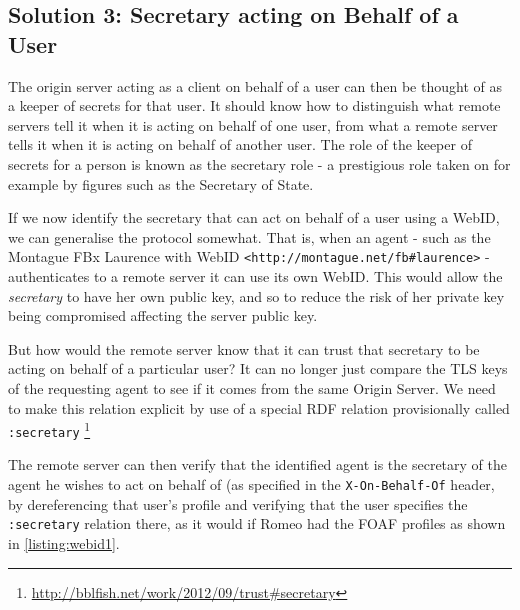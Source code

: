 \documentclass[a4paper]{llncs}
\begin{document}

\subsection{Solution 3: Secretary acting on Behalf of a User}

The origin server acting as a client on behalf of a user can then be thought of as a keeper of secrets for that user.
It should know how to distinguish what remote servers tell it when it is acting on behalf of one user, from what a remote server tells it when it is acting on behalf of another user.
The role of the keeper of secrets for a person is known as the secretary role - a prestigious role taken on for example by figures such as the Secretary of State.

If we now identify the secretary that can act on behalf of a user using a WebID, we can generalise the protocol somewhat.
That is, when an agent - such as the Montague FBx Laurence with WebID \lstinline|<http://montague.net/fb#laurence>| - authenticates to a remote server it can use its own WebID. 
This would allow the \textit{secretary} to have her own public key, and so to reduce the risk of her private key being compromised affecting the server public key.

But how would the remote server know that it can trust that secretary to be acting on behalf of a particular user?
It can no longer just compare the TLS keys of the requesting agent to see if it comes from the same Origin Server.
We need to make this relation explicit by use of a special RDF relation provisionally called \lstinline|:secretary|%
\footnote{\url{http://bblfish.net/work/2012/09/trust\#secretary} }

%

The remote server can then verify that the identified agent is the secretary of the agent he wishes to act on behalf of (as specified in the \lstinline|X-On-Behalf-Of| header, by dereferencing that user's profile and verifying that the user specifies the \texttt{:secretary} relation there, as it would if Romeo had the FOAF profiles as shown in \autoref{listing:webid1}.


\end{document}
